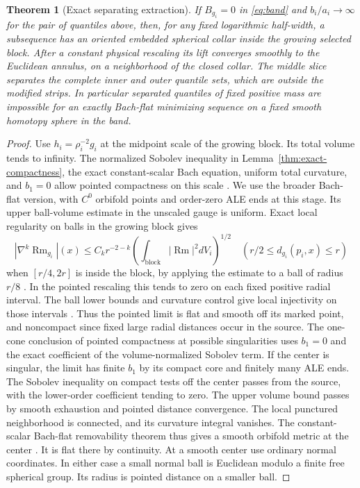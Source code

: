 \documentclass[11pt]{article}
\numberwithin{equation}{section}
\newtheorem{theorem}{Theorem}[section]
\theoremstyle{definition}
\theoremstyle{remark}
\newcommand{\Rm}{\operatorname{Rm}}
\begin{document}
\begin{theorem}[Exact separating extraction]\label{thm:exactcut}
If \(B_{g_i}=0\) in \eqref{eq:band} and \(b_i/a_i\to\infty\)
for the pair of quantiles above, then, for any fixed
logarithmic half-width, a subsequence has an oriented
embedded spherical collar inside the growing selected block.
After a constant physical rescaling its lift converges
smoothly to the Euclidean annulus, on a neighborhood of
the closed collar. The middle slice separates the complete
inner and outer quantile sets, which are outside the
modified strips. In particular separated quantiles of fixed
positive mass are impossible for an exactly Bach-flat
minimizing sequence on a fixed smooth homotopy sphere in
the band.
\end{theorem}

\begin{proof}
Use \(h_i=\rho_i^{-2}g_i\) at the midpoint scale of the
growing block. Its total volume tends to infinity. The
normalized Sobolev inequality in
Lemma~\ref{thm:exact-compactness}, the exact
constant-scalar Bach equation, uniform total curvature,
and \(b_1=0\) allow pointed compactness on this scale
\cite[Theorems 1.1--1.3, following remark and \S7]{TianViaclovsky2004Moduli}.
We use the broader Bach-flat version, with \(C^0\) orbifold
points and order-zero ALE ends at this stage. Its upper
ball-volume estimate in the unscaled gauge is uniform.
Exact local regularity on balls in the growing block gives
\[
 |\nabla^k\Rm_{g_i}|(x)\le C_k r^{-2-k}
        \left(\int_{\mathrm{block}}|\Rm|^2dV_i\right)^{1/2}
 \quad(r/2\le d_{g_i}(p_i,x)\le r)
\]
when \([r/4,2r]\) is inside the block, by applying the
estimate to a ball of radius \(r/8\)
\cite[Theorem 2.4]{ChangQingYang2006Gap}. In the
pointed rescaling this tends to zero on each fixed positive
radial interval. The ball lower bounds and curvature
control give local injectivity on those intervals
\cite[Theorem 4.7]{CheegerGromovTaylor1982}.
Thus the pointed limit is flat and smooth off its marked
point, and noncompact since fixed large radial distances
occur in the source. The one-cone conclusion of pointed
compactness at possible singularities uses \(b_1=0\) and
the exact coefficient of the volume-normalized Sobolev
term. If the center is singular, the limit has finite
\(b_1\) by its compact core and finitely many ALE ends.
The Sobolev inequality on compact tests off the center
passes from the source, with the lower-order coefficient
tending to zero. The upper volume bound passes by smooth
exhaustion and pointed distance convergence. The local
punctured neighborhood is connected, and its curvature
integral vanishes. The constant-scalar Bach-flat
removability theorem thus gives a smooth orbifold metric
at the center \cite[Theorem 1.2 and \S5]{Streets2007Removal}.
It is flat there by continuity. At a smooth center use
ordinary normal coordinates. In either case a small
normal ball is Euclidean modulo a finite free spherical
group. Its radius is pointed distance on a smaller ball.


\end{proof}
\end{document}
